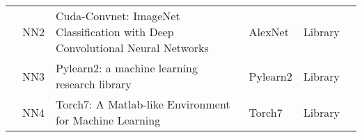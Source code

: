 \begin{table*}[htbp]
\begin{tabular}{llp{8cm}lll}
		                         & \small NN2         & \small Cuda-Convnet: ImageNet Classification with Deep Convolutional Neural Networks  & \small AlexNet         & \small Library       & \small \cite{_ag,krizhevsky_imagenet_2012}            \\[1ex]
		                         & \small NN3         & \small Pylearn2: a machine learning research library                                  & \small Pylearn2        & \small Library       & \small \cite{Goodfellow.EtAl_2013}                    \\
		                         & \small NN4         & \small Torch7: A Matlab-like Environment for Machine Learning                         & \small Torch7          & \small Library       & \small \cite{Collobert.EtAl_}                         \\
		\hline
	\end{tabular}
\end{table*}
